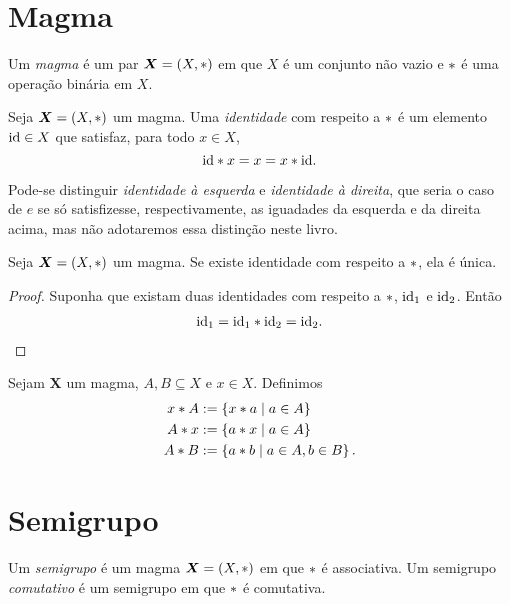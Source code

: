 \section{Magma}

\begin{defi}
Um \emph{magma} é um par $\bm X=(X,\ast)$ em que $X$ é um conjunto não vazio e $ \ast $ é uma operação binária em $X$.
\end{defi}

\begin{defi}[Identidade]
Seja $\bm X=(X, \ast )$ um magma. Uma \emph{identidade} com respeito a $\ast$ é um elemento $\mathrm{id} \in X$ que satisfaz, para todo $x \in X$,
	\begin{equation*}
	\mathrm{id} \ast x = x = x \ast \mathrm{id}.
	\end{equation*}
\end{defi}

Pode-se distinguir \emph{identidade à esquerda} e \emph{identidade à direita}, que seria o caso de $e$ se só satisfizesse, respectivamente, as iguadades da esquerda e da direita acima, mas não adotaremos essa distinção neste livro.

\begin{prop}
\label{prop:unic.elem.neut}
Seja $\bm X = (X, \ast )$ um magma. Se existe identidade com respeito a $\ast$, ela é única.
\end{prop}
\begin{proof}
Suponha que existam duas identidades com respeito a $\ast$, $\mathrm{id}_1$ e $\mathrm{id}_2$. Então
	\begin{align*}
	\mathrm{id}_1 = \mathrm{id}_1 \ast \mathrm{id}_2 = \mathrm{id}_2.
	\end{align*}
\end{proof}

\begin{defi}
Sejam $\bm X$ um magma, $A,B \subseteq X$ e $x \in X$. Definimos
	\begin{align*}
	x \ast A &:= \left\{x \ast a \;\middle\vert\; a \in A \right\} \\
	A \ast x &:= \left\{a\ast x \;\middle\vert\; a \in A \right\} \\
	A \ast B &:= \left\{a \ast b \;\middle\vert\; a \in A,b \in B \right\}.
	\end{align*}
\end{defi}

\section{Semigrupo}

\begin{defi}
Um \emph{semigrupo} é um magma $\bm X=(X,\ast)$ em que $\ast$ é associativa. Um semigrupo \emph{comutativo} é um semigrupo em que $\ast$ é comutativa.
\end{defi}

